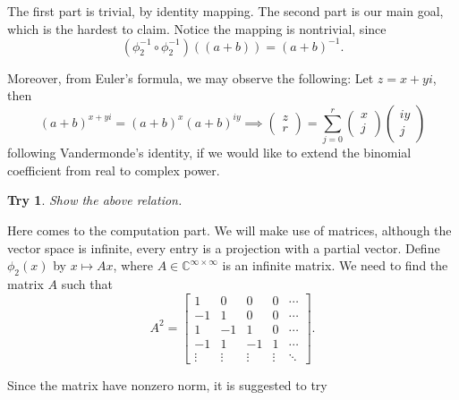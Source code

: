 \documentclass[12pt]{article}
\newtheorem*{exercise}{Try}
\begin{document}
    The first part is trivial, by identity mapping. The second part is our main goal, which is the hardest to claim. Notice the mapping is nontrivial, since \[(\phi_2^{-1}\circ \phi_2^{-1})((a+b))=(a+b)^{-1}.\]

    Moreover, from Euler's formula, we may observe the following: Let $z=x+yi$, then \[(a+b)^{x+yi}=(a+b)^x (a+b)^{iy} \implies \begin{pmatrix}
        z\\r
    \end{pmatrix}=\sum_{j=0}^{r}\begin{pmatrix}
        x\\j
    \end{pmatrix}\begin{pmatrix}
        iy\\j
    \end{pmatrix}\] following Vandermonde's identity, if we would like to extend the binomial coefficient from real to complex power.

    \begin{exercise}
        Show the above relation.
    \end{exercise}

    Here comes to the computation part. We will make use of matrices, although the vector space is infinite, every entry is a projection with a partial vector. Define $\phi_2(x)$ by $x\mapsto Ax$, where $A\in\mathbb{C}^{\infty\times\infty}$ is an infinite matrix. We need to find the matrix $A$ such that \[A^2=\begin{bmatrix}
        1&0&0&0&\cdots\\
        -1&1&0&0&\cdots\\
        1&-1&1&0&\cdots\\
        -1&1&-1&1&\cdots\\
        \vdots&\vdots&\vdots&\vdots&\ddots
    \end{bmatrix}.\]

    Since the matrix have nonzero norm, it is suggested to try 
\end{document}
